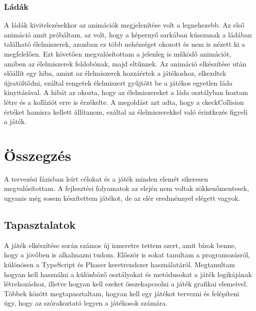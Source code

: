 \documentclass[12pt, a4paper]{report}
\theoremstyle{definition}
\begin{document}
	\subsection{Ládák}
	A ládák kivitelezésekkor az animációk megjelenítése volt a legnehezebb. Az első animáció amit próbáltam, az volt, hogy a képernyő sarkában kússzanak a ládában található élelmiszerek, azonban ez több nehézséget okozott és nem is nézett ki a megfelelően. Ezt követően megvalósítottam a jelenleg is működő animációt, amiben az élelmiszerek feldobónak, majd eltűnnek. Az animáció elkészítése után előállít egy hiba, amint az élelmiszerek hozzáértek a játékoshoz, elkezdtek újratöltődni, ezáltal rengetek élelmiszert gyűjtött be a játékos egyetlen láda kinyitásával. A hibát az okozta, hogy az élelmiszereket a láda osztályban hoztam létre és a kollíziót erre is érzékelte. A megoldást azt adta, hogy a ckeckCollision értéket hamisra kellett állítanom, ezáltal az élelmiszerekkel való érintkezés figyeli a játék.
	
	
	
	\chapter{Összegzés}
	A tervezési fázisban leírt célokat és a játék minden elemét sikeresen megvalósítottam. A fejlesztési folyamatok az elején nem voltak zökkenőmentesek, ugyanis még sosem készítettem játékot, de az elér eredménnyel elégett vagyok.
	\section{Tapasztalatok}
	A játék elkészítése során számos új ismeretre tettem szert, amit bízok benne, hogy a jövőben is alkalmazni tudom. Először is sokat tanultam a programozásról, különösen a TypeScript és Phaser keretrendszer használatáról. Megtanultam hogyan kell használni a különböző osztályokat és metódusokat a játék logikájának létrehozáshoz, illetve hogyan kell ezeket összekapcsolni a játék grafikai elemeivel. Többek között  megtapasztaltam, hogyan kell egy játékot tervezni és felépíteni úgy, hogy az szórakoztató legyen a játékosok számára.
	
\end{document}

